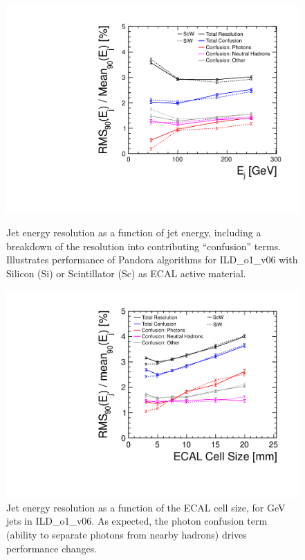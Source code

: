 \begin{figure}
	\begin{minipage}{.49\textwidth}
		\includegraphics[width=\textwidth]{Software/PandoraPFA/JetEnergyResolution}
		\caption{Jet energy resolution as a function of jet energy, including a breakdown of the
		resolution into contributing ``confusion'' terms. Illustrates performance of
		Pandora algorithms for ILD\_o1\_v06 with Silicon (Si) or Scintillator (Sc) as ECAL
		active material.}
		\label{fig:Software:PandoraPFA:JetEnergyResolution}
	\end{minipage}\hfill
	\begin{minipage}{.49\textwidth}
		\includegraphics[width=\textwidth]{Software/PandoraPFA/ECAL_CellSize}
		\caption{Jet energy resolution as a function of the ECAL cell size, for \unit[250]{GeV} jets in
		ILD\_o1\_v06. As expected, the photon confusion term (ability to separate photons
		from nearby hadrons) drives performance changes.}
		\label{fig:Software:PandoraPFA:ECAL_CellSize}
	\end{minipage}
\end{figure}

